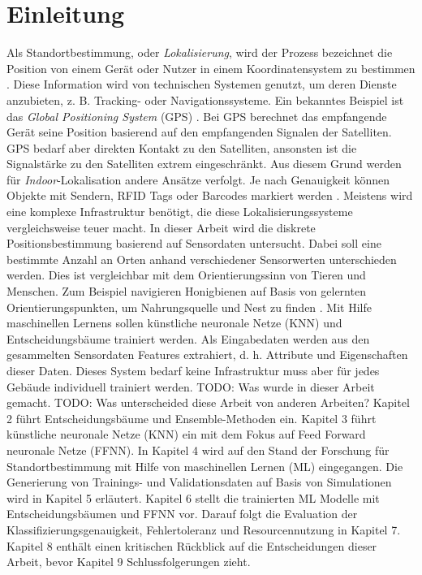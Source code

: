 \chapter{Einleitung}
Als Standortbestimmung, oder \textit{Lokalisierung}, wird der Prozess bezeichnet die Position von einem Gerät oder Nutzer in einem Koordinatensystem zu bestimmen \cite{bulusu2000gps}.
Diese Information wird von technischen Systemen genutzt, um deren Dienste anzubieten, z. B. Tracking- oder Navigationssysteme.
Ein bekanntes Beispiel ist das \textit{Global Positioning System} (GPS) \cite{kaplan2005understanding}.
Bei GPS berechnet das empfangende Gerät seine Position basierend auf den empfangenden Signalen der Satelliten.
\newline
\newline
GPS bedarf aber direkten Kontakt zu den Satelliten, ansonsten ist die Signalstärke zu den Satelliten extrem eingeschränkt.
Aus diesem Grund werden für \textit{Indoor}-Lokalisation andere Ansätze verfolgt.
Je nach Genauigkeit können Objekte mit Sendern, RFID Tags oder Barcodes markiert werden \cite{xiao2016survey}.
Meistens wird eine komplexe Infrastruktur benötigt, die diese Lokalisierungssysteme vergleichsweise teuer macht.
\newline
\newline
In dieser Arbeit wird die diskrete Positionsbestimmung basierend auf Sensordaten untersucht.
Dabei soll eine bestimmte Anzahl an Orten anhand verschiedener Sensorwerten unterschieden werden.
Dies ist vergleichbar mit dem Orientierungssinn von Tieren und Menschen.
Zum Beispiel navigieren Honigbienen auf Basis von gelernten Orientierungspunkten, um Nahrungsquelle und Nest zu finden \cite{menzel1996knowledge}.
Mit Hilfe maschinellen Lernens sollen künstliche neuronale Netze (KNN) und Entscheidungsbäume trainiert werden.
Als Eingabedaten werden aus den gesammelten Sensordaten Features extrahiert, d. h. Attribute und Eigenschaften dieser Daten.
Dieses System bedarf keine Infrastruktur muss aber für jedes Gebäude individuell trainiert werden.
\newline
\newline
TODO: Was wurde in dieser Arbeit gemacht.
\newline
TODO: Was unterscheided diese Arbeit von anderen Arbeiten?
\newline
\newline
Kapitel 2 führt Entscheidungsbäume und Ensemble-Methoden ein.
Kapitel 3 führt künstliche neuronale Netze (KNN) ein mit dem Fokus auf Feed Forward neuronale Netze (FFNN).
In Kapitel 4 wird auf den Stand der Forschung für Standortbestimmung mit Hilfe von maschinellen Lernen (ML) eingegangen.
Die Generierung von Trainings- und Validationsdaten auf Basis von Simulationen wird in Kapitel 5 erläutert.
Kapitel 6 stellt die trainierten ML Modelle mit Entscheidungsbäumen und FFNN vor.
Darauf folgt die Evaluation der Klassifizierungsgenauigkeit, Fehlertoleranz und Resourcennutzung in Kapitel 7.
Kapitel 8 enthält einen kritischen Rückblick auf die Entscheidungen dieser Arbeit, bevor Kapitel 9 Schlussfolgerungen zieht.